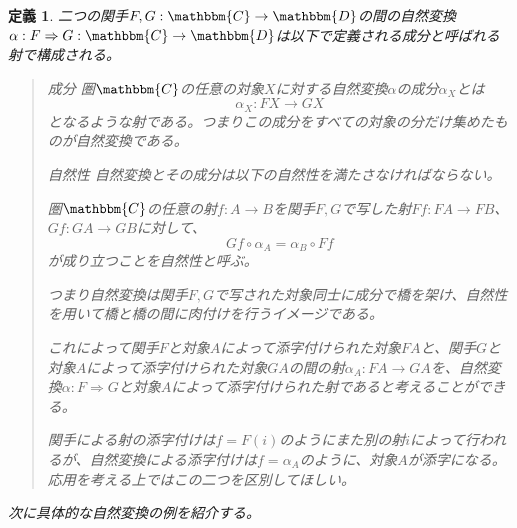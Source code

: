 \documentclass[uplatex,dvipdfmx]{jsarticle}
\newcommand{\cat}[1]{\mathbbm{#1}}
\newcommand{\arrow}{\rightarrow}
\newcommand{\functor}[3]{#1:\cat{#2}\arrow \cat{#3}}
\newcommand{\nat}[3]{#1:#2\Rightarrow #3}
\newcommand{\natf}[5]{#1:#2\Rightarrow #3:\cat{#4}\arrow \cat{#5}}
\newcommand{\mor}[3]{#1:#2\arrow #3}
\newtheorem{define}[proof]{定義}
\numberwithin{proof}{subsection}
\newenvironment{mydescription}
{\begin{description}
  \setlength{\parskip}{0.5cm}
}
{\end{description}}
\begin{document}
  \begin{define}
		二つの関手$\functor{F,G}{C}{D}$の間の自然変換$\natf{\alpha}{F}{G}{C}{D}$は以下で定義される成分と呼ばれる射で構成される。
		\begin{quote}
			\begin{mydescription}
				\item[成分] 圏$\cat{C}$の任意の対象$X$に対する自然変換$\alpha$の成分$\alpha_X$とは\[\mor{\alpha_X}{FX}{GX}\]となるような射である。つまりこの成分をすべての対象の分だけ集めたものが自然変換である。
				\item[自然性]
				自然変換とその成分は以下の自然性を満たさなければならない。

				圏$\cat{C}$の任意の射$\mor{f}{A}{B}$を関手$F,G$で写した射$\mor{Ff}{FA}{FB}$、$\mor{Gf}{GA}{GB}$に対して、\[Gf\circ\alpha_A=\alpha_B\circ Ff\]が成り立つことを自然性と呼ぶ。
				\begin{center}
				\end{center}
				つまり自然変換は関手$F,G$で写された対象同士に成分で橋を架け、自然性を用いて橋と橋の間に肉付けを行うイメージである。
        
        これによって関手$F$と対象$A$によって添字付けられた対象$FA$と、関手$G$と対象$A$によって添字付けられた対象$GA$の間の射$\mor{\alpha_A}{FA}{GA}$を、自然変換$\nat{\alpha}{F}{G}$と対象$A$によって添字付けられた射であると考えることができる。

        関手による射の添字付けは$f=F(i)$のようにまた別の射$i$によって行われるが、自然変換による添字付けは$f=\alpha_A$のように、対象$A$が添字になる。応用を考える上ではこの二つを区別してほしい。
			\end{mydescription}
		\end{quote}
		次に具体的な自然変換の例を紹介する。
	\end{define}
\end{document}
